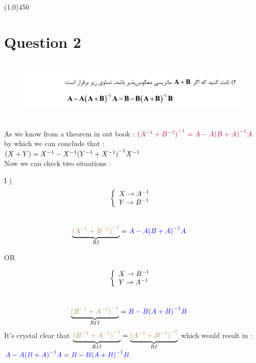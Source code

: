 \documentclass[a4paper,12pt]{article}
\begin{document}
\line(1,0){450}
\newpage
\section {Question 2 }


\begin{figure}[h!]
	\centering
	\includegraphics*[height=3cm]{Q2}
\end{figure}



\begin{doublespace}
As we know from a theorem in out book : $ \textcolor{purple}{ { ({A}^{-1} + {B}^{-1} )}^{-1} = A - A{( B + A )}^{-1} A}$  by which we can conclude that : \\
$ ( X + Y ) = {X}^{-1} - {X}^{-1}{({Y}^{-1} + {X}^{-1})}^{-1}{X}^{-1} $\\
Now we can check two situations : 

I ) 
	\[ \left\{
	  \begin{array}{lr}
	   X \rightarrow {A}^{-1}\\
	    Y \rightarrow {B}^{-1}
	  \end{array}
	\right.
	\]
	\\
	 \begin{align*}
		& \underbrace{\textcolor{brown}{{({A}^{-1} + {B}^{-1})}^{-1}}}_{RI}   = \textcolor {blue}{A - A{( B + A )}^{-1}A}
	 \end{align*}

OR

	\[ \left\{
	  \begin{array}{lr}
	   X \rightarrow {B}^{-1}\\
	    Y \rightarrow {A}^{-1}
	  \end{array}
	\right.
	\]
	\\
	 \begin{align*}
		& \underbrace{ \textcolor{brown}{{({B}^{-1} + {A}^{-1})}^{-1} }}_{RII}= \textcolor {blue}{B - B{( A + B )}^{-1}B}
	 \end{align*}
It's crystal clear that $ \underbrace{ \textcolor{brown}{{({B}^{-1} + {A}^{-1})}^{-1}}}_{RII} = \underbrace{\textcolor{brown}{{({A}^{-1} + {B}^{-1})}^{-1}}}_{RI}  $ which would result in : $\\
\textcolor {blue}{A - A{( B + A )}^{-1}A} =\textcolor {blue}{B - B{( A + B )}^{-1}B} $ 
\end{doublespace}
\newpage
\end{document}

